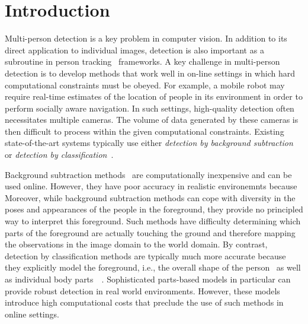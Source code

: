 \documentclass[10pt,twocolumn,letterpaper]{article}
\begin{document}
\section{Introduction}
Multi-person detection is a key problem in computer vision. In addition to its direct application to individual images, detection is also important as a subroutine in person tracking~\cite{andriluka2008people} frameworks.
A key challenge in multi-person detection is to develop methods that work well in on-line settings in which hard computational constraints must be obeyed. For example, a mobile robot may require real-time estimates of the location of people in its environment in order to perform socially aware navigation. In such settings, high-quality detection often necessitates multiple cameras. The volume of data generated by these cameras is then difficult to process within the given computational constraints.
Existing state-of-the-art systems typically use either \emph{detection by background subtraction}~\cite{horprasert1999statistical} or \emph{detection by classification}~\cite{breitenstein2009robust, Pami-11}.

Background subtraction methods~\cite{bk1,bk2-bayesian} are computationally inexpensive and can be used online. However, they have poor accuracy in realistic environemnts because 
Moreover, while background subtraction methods can cope with diversity in the poses and appearances of the people in the foreground, they provide no principled way to interpret this foreground. Such methods have difficulty determining which parts of the foreground are actually touching the ground and therefore mapping the observations in the image domain to the world domain. 
By contrast, detection by classification methods are typically much more accurate because they explicitly model the foreground, i.e., the overall shape of the person~\cite{dalaltriggs} as well as individual body parts~\cite{DPM}~\cite{partsDeva}. Sophisticated parts-based models in particular can provide robust detection in real world environments. However, these models introduce high computational costs that preclude the use of such methods in online settings.
\end{document}

